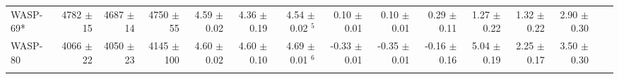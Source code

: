 \begin{sidewaystable*}[t!]
{\begin{tabular}{l r r r r r r r r r r r r r r}
WASP-69*  
&  4782  $\pm$ 15 
& 4687  $\pm$ 14 
&  4750 $\pm$ 55 
&   4.59  $\pm$ 0.02  
&  4.36  $\pm$ 0.19 
& 4.54  $\pm$ 0.02 $^5$ 
& 0.10  $\pm$ 0.01 
& 0.10  $\pm$ 0.01 
&  0.29   $\pm$ 0.11 
&  1.27  $\pm$ 0.22 
& 1.32  $\pm$ 0.22 
&  2.90   $\pm$ 0.30 \\





WASP-80  
&  4066  $\pm$ 22 
& 4050  $\pm$ 23 
&  4145 $\pm$ 100 
&   4.60  $\pm$ 0.02  
&  4.60  $\pm$ 0.10 
&  4.69  $\pm$ 0.01 $^6$ 
&  -0.33  $\pm$ 0.01 
& -0.35  $\pm$ 0.01 
&  -0.16   $\pm$ 0.16 
&  5.04  $\pm$ 0.19 
& 2.25  $\pm$ 0.17 
&  3.50   $\pm$ 0.30  \\


\hline
\label{wavelet:table:waspstars}  
               
\end{tabular}}

\end{sidewaystable*}